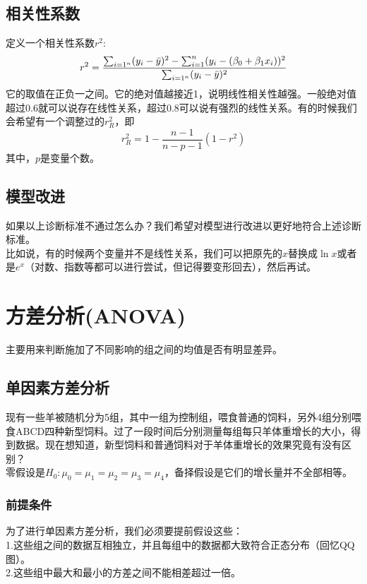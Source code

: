 \documentclass{MGLSA-cn-book-math}
\begin{document}
\section{相关性系数}
定义一个相关性系数$r^2$:
\[
r^2=\frac{\sum_{i=1^n}(y_i-\Bar{y})^2-\sum_{i=1}^n(y_i-(\beta_0+\beta_1x_i))^2}{\sum_{i=1^n}(y_i-\Bar{y})^2}
\]
它的取值在正负一之间。它的绝对值越接近1，说明线性相关性越强。一般绝对值超过0.6就可以说存在线性关系，超过0.8可以说有强烈的线性关系。有的时候我们会希望有一个调整过的$r^2_R$，即
\[
r^2_R=1-\frac{n-1}{n-p-1}(1-r^2)
\]
其中，$p$是变量个数。
\section{模型改进}
如果以上诊断标准不通过怎么办？我们希望对模型进行改进以更好地符合上述诊断标准。\\
\indent 比如说，有的时候两个变量并不是线性关系，我们可以把原先的$x$替换成$\ln{x}$或者是$e^x$（对数、指数等都可以进行尝试，但记得要变形回去），然后再试。
\chapter{方差分析(ANOVA)}
主要用来判断施加了不同影响的组之间的均值是否有明显差异。
\section{单因素方差分析}
现有一些羊被随机分为5组，其中一组为控制组，喂食普通的饲料，另外4组分别喂食ABCD四种新型饲料。过了一段时间后分别测量每组每只羊体重增长的大小，得到数据。现在想知道，新型饲料和普通饲料对于羊体重增长的效果究竟有没有区别？\\
\indent 零假设是$H_0: \mu_0=\mu_1=\mu_2=\mu_3=\mu_4$，备择假设是它们的增长量并不全部相等。
\subsection{前提条件}
为了进行单因素方差分析，我们必须要提前假设这些：\\
1.这些组之间的数据互相独立，并且每组中的数据都大致符合正态分布（回忆QQ图）。\\
2.这些组中最大和最小的方差之间不能相差超过一倍。\\
\end{document}

